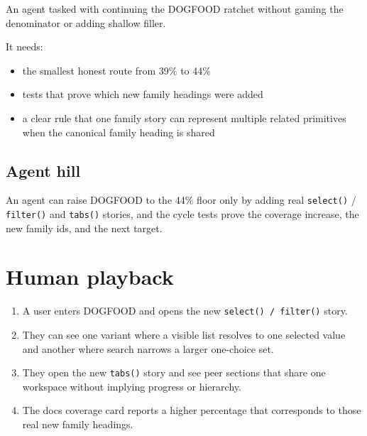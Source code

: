 An agent tasked with continuing the DOGFOOD ratchet without gaming the denominator or adding shallow filler.

It needs:

\begin{itemize}
\tightlist
\item
  the smallest honest route from 39\% to 44\%
\item
  tests that prove which new family headings were added
\item
  a clear rule that one family story can represent multiple related primitives when the canonical family heading is shared
\end{itemize}

\subsection{Agent hill}\label{record-072-agent-hill}

An agent can raise DOGFOOD to the 44\% floor only by adding real \texttt{s\allowbreak{}e\allowbreak{}l\allowbreak{}e\allowbreak{}c\allowbreak{}t\allowbreak{}(\allowbreak{})} / \texttt{f\allowbreak{}i\allowbreak{}l\allowbreak{}t\allowbreak{}e\allowbreak{}r\allowbreak{}(\allowbreak{})} and \texttt{t\allowbreak{}a\allowbreak{}b\allowbreak{}s\allowbreak{}(\allowbreak{})} stories, and the cycle tests prove the coverage increase, the new family ids, and the next target.

\section{Human playback}\label{record-072-human-playback}

\begin{enumerate}
\def\labelenumi{\arabic{enumi}.}
\tightlist
\item
  A user enters DOGFOOD and opens the new \texttt{s\allowbreak{}e\allowbreak{}l\allowbreak{}e\allowbreak{}c\allowbreak{}t\allowbreak{}(\allowbreak{})\allowbreak{} \allowbreak{}/\allowbreak{} \allowbreak{}f\allowbreak{}i\allowbreak{}l\allowbreak{}t\allowbreak{}e\allowbreak{}r\allowbreak{}(\allowbreak{})} story.
\item
  They can see one variant where a visible list resolves to one selected value and another where search narrows a larger one-choice set.
\item
  They open the new \texttt{t\allowbreak{}a\allowbreak{}b\allowbreak{}s\allowbreak{}(\allowbreak{})} story and see peer sections that share one workspace without implying progress or hierarchy.
\item
  The docs coverage card reports a higher percentage that corresponds to those real new family headings.
\end{enumerate}

